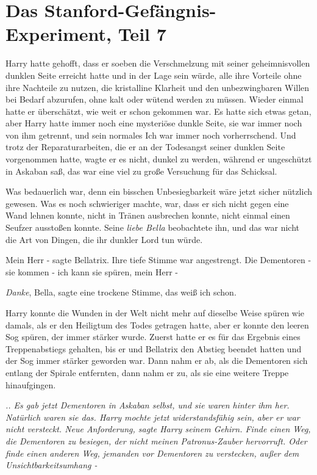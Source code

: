 \chapter{Das Stanford-Gefängnis-Experiment, Teil 7}

Harry hatte gehofft, dass er soeben die Verschmelzung mit seiner geheimnisvollen
dunklen Seite erreicht hatte und in der Lage sein würde, alle ihre Vorteile ohne
ihre Nachteile zu nutzen, die kristalline Klarheit und den unbezwingbaren Willen
bei Bedarf abzurufen, ohne kalt oder wütend werden zu müssen. Wieder einmal
hatte er überschätzt, wie weit er schon gekommen war. Es hatte sich etwas getan,
aber Harry hatte immer noch eine mysteriöse dunkle Seite, sie war immer noch von
ihm getrennt, und sein normales Ich war immer noch vorherrschend. Und trotz der
Reparaturarbeiten, die er an der Todesangst seiner dunklen Seite vorgenommen
hatte, wagte er es nicht, dunkel zu werden, während er ungeschützt in Askaban
saß, das war eine viel zu große Versuchung für das Schicksal.

Was bedauerlich war, denn ein bisschen Unbesiegbarkeit wäre jetzt sicher
nützlich gewesen. Was es noch schwieriger machte, war, dass er sich nicht gegen
eine Wand lehnen konnte, nicht in Tränen ausbrechen konnte, nicht einmal einen
Seufzer ausstoßen konnte. Seine \emph{liebe Bella} beobachtete ihn, und das war
nicht die Art von Dingen, die ihr dunkler Lord tun würde.

\glqq{}Mein Herr -\grqq{} sagte Bellatrix. Ihre tiefe Stimme war angestrengt.
\glqq{}Die Dementoren - sie kommen - ich kann sie spüren, mein Herr -\grqq{}

\glqq{}\emph{Danke}, Bella\grqq{}, sagte eine trockene Stimme, \glqq{}das weiß ich
schon.\grqq{}

Harry konnte die Wunden in der Welt nicht mehr auf dieselbe Weise spüren wie
damals, als er den Heiligtum des Todes getragen hatte, aber er konnte den leeren
Sog spüren, der immer stärker wurde. Zuerst hatte er es für das Ergebnis eines
Treppenabstiegs gehalten, bis er und Bellatrix den Abstieg beendet hatten und
der Sog immer stärker geworden war. Dann nahm er ab, als die Dementoren sich
entlang der Spirale entfernten, dann nahm er zu, als sie eine weitere Treppe
hinaufgingen.

\emph{.. Es gab jetzt Dementoren in Askaban selbst, und sie waren hinter ihm
her. Natürlich waren sie das. Harry mochte jetzt widerstandsfähig sein, aber er
war nicht versteckt. Neue Anforderung, sagte Harry seinem Gehirn. Finde einen
Weg, die Dementoren zu besiegen, der nicht meinen Patronus-Zauber hervorruft.
Oder finde einen anderen Weg, jemanden vor Dementoren zu verstecken, außer dem
Unsichtbarkeitsumhang -}

